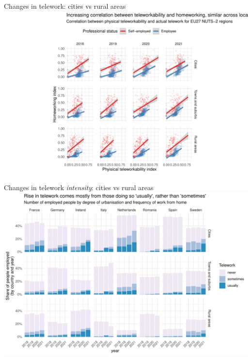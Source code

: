 \documentclass[10pt]{beamer}
\begin{document}
\begin{frame}{Changes in telework: cities vs rural areas}
\pause
\centering
\includegraphics[width=\textwidth,height=0.9\textheight,keepaspectratio]{Correlation_teleworkability_telework_degurba.pdf}
\end{frame}


\begin{frame}{Changes in telework \emph{intensity}: cities vs rural areas}
\pause
\centering
\includegraphics[width=\textwidth,height=0.9\textheight,keepaspectratio]{Telework_intensity_degurba_selected.pdf}
\end{frame}
\end{document}
